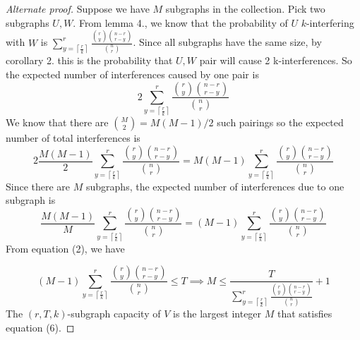 \documentclass[10pt]{extarticle}
\theoremstyle{definition}
\begin{document}
\begin{proof}[Alternate proof]
    Suppose we have $M$ subgraphs in the collection. Pick two subgraphs $U,W$. From lemma 4., we know that the probability of $U$ $k$-interfering with $W$ is $\sum_{y = \left\lceil \frac{r}{k} \right\rceil}^{r}  \frac{\binom{r}{y} \binom{n-r}{r-y}}{\binom{n}{r}}$. Since all subgraphs have the same size, by corollary 2. this is the probability that $U,W$ pair will cause 2 k-interferences. So the expected number of interferences caused by one pair is
    $$
    2\sum_{y = \left\lceil \frac{r}{k} \right\rceil}^{r}  \frac{\binom{r}{y} \binom{n-r}{r-y}}{\binom{n}{r}} 
    $$
    We know that there are $\binom{M}{2} = M(M-1)/2$ such pairings so the expected number of total interferences is
    $$
    2 \frac{M(M-1)}{2} \sum_{y = \left\lceil \frac{r}{k} \right\rceil}^{r}  \frac{\binom{r}{y} \binom{n-r}{r-y}}{\binom{n}{r}}  =  M(M-1) \sum_{y = \left\lceil \frac{r}{k} \right\rceil}^{r}  \frac{\binom{r}{y} \binom{n-r}{r-y}}{\binom{n}{r}} 
    $$
    Since there are $M$ subgraphs, the expected number of interferences due to one subgraph is
    $$
    \frac{M(M-1)}{M} \sum_{y = \left\lceil \frac{r}{k} \right\rceil}^{r}  \frac{\binom{r}{y} \binom{n-r}{r-y}}{\binom{n}{r}}  = (M-1) \sum_{y = \left\lceil \frac{r}{k} \right\rceil}^{r}  \frac{\binom{r}{y} \binom{n-r}{r-y}}{\binom{n}{r}} 
    $$
    From equation (2), we have 

    \begin{equation*}
        (M-1) \sum_{y = \left\lceil \frac{r}{k} \right\rceil}^{r}  \frac{\binom{r}{y} \binom{n-r}{r-y}}{\binom{n}{r}}  \le T \implies M \le \frac{T}{\sum_{y = \left\lceil \frac{r}{k} \right\rceil}^{r}  \frac{\binom{r}{y} \binom{n-r}{r-y}}{\binom{n}{r}}} + 1
    \end{equation*}
    The $(r,T,k)$-subgraph capacity of $V$ is the largest integer $M$ that satisfies equation (6).
    
\end{proof}
\end{document}
